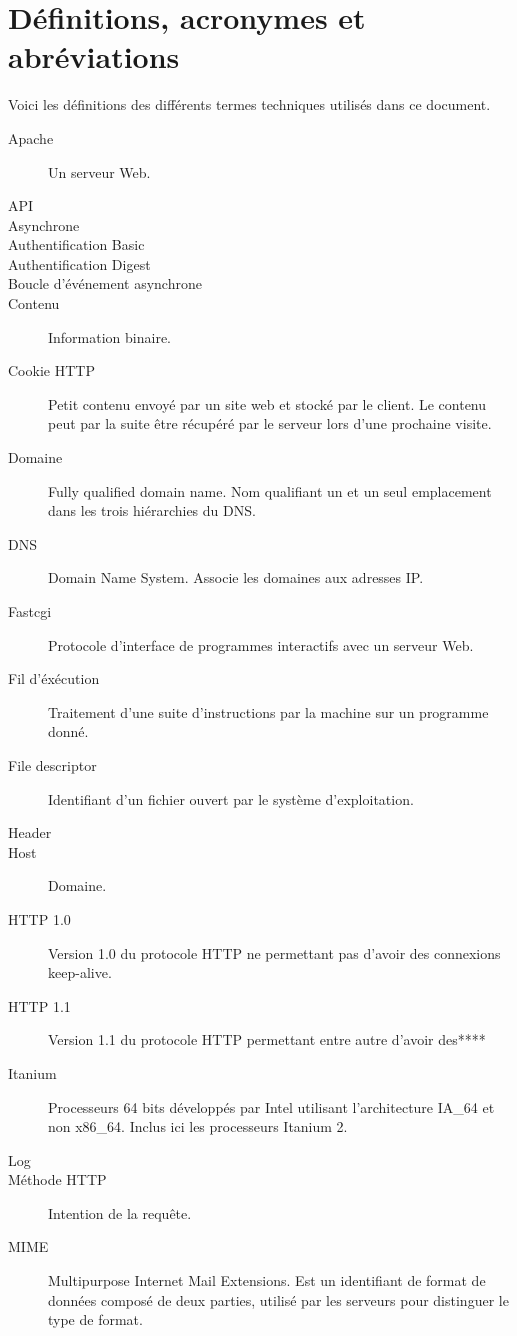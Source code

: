 \documentclass{scrreprt}
\begin{document}
\section{Définitions, acronymes et abréviations}
Voici les définitions des différents termes techniques utilisés dans ce
document.
\begin{description}
    \item[Apache] Un serveur Web.
	\item[API]
    \item[Asynchrone]
	\item[Authentification Basic]
    \item[Authentification Digest]
	\item[Boucle d'événement asynchrone]
    \item[Contenu] Information binaire.
    \item[Cookie HTTP] Petit contenu envoyé par un site web et stocké par le client. Le contenu peut par la suite être récupéré par le serveur lors d'une prochaine visite.
    \item[Domaine] Fully qualified domain name. Nom qualifiant un et un seul emplacement dans les trois hiérarchies du DNS.
    \item[DNS] Domain Name System. Associe les domaines aux adresses IP.
    \item[Fastcgi] Protocole d'interface de programmes interactifs avec un serveur Web. 
    \item[Fil d'éxécution] Traitement d'une suite d'instructions par la machine sur un programme donné.
    \item[File descriptor] Identifiant d'un fichier ouvert par le système d'exploitation. 
 	\item[Header]
    \item[Host] Domaine.	
	\item[HTTP 1.0] Version 1.0 du protocole HTTP ne permettant pas d'avoir des
connexions keep-alive.
	\item[HTTP 1.1] Version 1.1 du protocole HTTP permettant entre autre d'avoir des****
    \item[Itanium] Processeurs 64 bits développés par Intel utilisant l'architecture IA_64 et non x86_64. Inclus ici les processeurs Itanium 2.
	\item[Log]   
    \item[Méthode HTTP] Intention de la requête.
	\item[MIME] Multipurpose Internet Mail Extensions. Est un identifiant de format de données composé de deux parties, utilisé par les serveurs pour distinguer le type de format.

\end{description}
\end{document}
